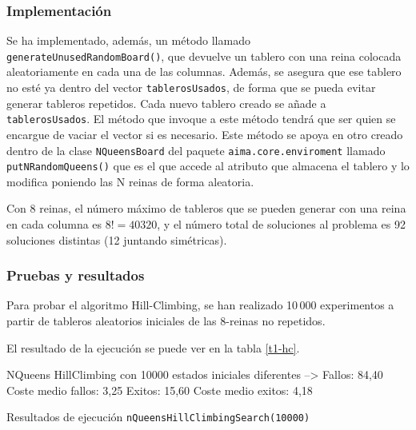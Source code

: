 \documentclass[..main.tex]{subfiles}
\begin{document}
\subsubsection{Implementación}


Se ha implementado, además, un método llamado \texttt{generateUnusedRandomBoard()}, que devuelve un tablero con una reina colocada aleatoriamente en cada una de las columnas. Además, se asegura que ese tablero no esté ya dentro del vector \texttt{tablerosUsados}, de forma que se pueda evitar generar tableros repetidos. Cada nuevo tablero creado se añade a \texttt{tablerosUsados}. El método que invoque a este método tendrá que ser quien se encargue de vaciar el vector si es necesario. Este método se apoya en otro creado dentro de la clase \texttt{NQueensBoard} del paquete \texttt{aima.core.enviroment} llamado \texttt{putNRandomQueens()} que es el que accede al atributo que almacena el tablero y lo modifica poniendo las N reinas de forma aleatoria. 

Con 8 reinas, el número máximo de tableros que se pueden generar con una reina en cada columna es $8! = 40320$, y el número total de soluciones al problema es 92 soluciones distintas (12 juntando simétricas).

\subsubsection{Pruebas y resultados}
Para probar el algoritmo Hill-Climbing, se han realizado 10\,000 experimentos a partir de tableros aleatorios iniciales de las 8-reinas no repetidos.

El resultado de la ejecución se puede ver en la tabla \ref{t1-hc}.

\begin{table}[h]
\centering
\begin{LVerbatim}[frame=single]
NQueens HillClimbing con 10000 estados iniciales diferentes  -->
Fallos: 84,40
Coste medio fallos: 3,25
Exitos: 15,60
Coste medio exitos: 4,18
 \end{LVerbatim}
      \caption{\label{t1-hc} Resultados de ejecución \texttt{nQueensHillClimbingSearch(10000)}}
\end{table}
\end{document}
